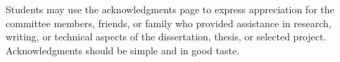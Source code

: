 \afterpage{\cleardoublepage}
%
Students may use the acknowledgments page to express appreciation for
the committee members, friends, or family who provided assistance in
research, writing, or technical aspects of the dissertation, thesis,
or selected project.  Acknowledgments should be simple and in good
taste.